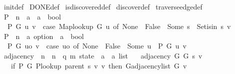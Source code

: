 \begin{isabellebody}
%
\isatagdocument
%
\isamarkuptrue%
%
\endisatagdocument
{\isafolddocument}%
%
\isadelimdocument
%
\endisadelimdocument
{}\isamarkupfalse%
\ init{\isacharunderscore}{\kern0pt}def\isanewline
\isanewline
{}\isamarkupfalse%
\ DONE{\isacharunderscore}{\kern0pt}def\isanewline
\isanewline
{}\isamarkupfalse%
\ is{\isacharunderscore}{\kern0pt}discovered{\isacharunderscore}{\kern0pt}def\isanewline
\isanewline
{}\isamarkupfalse%
\ discover{\isacharunderscore}{\kern0pt}def\isanewline
\isanewline
{}\isamarkupfalse%
\ traverse{\isacharunderscore}{\kern0pt}edge{\isacharunderscore}{\kern0pt}def\isanewline
\isanewline
{}\isamarkupfalse%
\ P\ {\isacharcolon}{\kern0pt}{\isacharcolon}{\kern0pt}\ {\isachardoublequoteopen}{\isacharprime}{\kern0pt}n\ {\isasymRightarrow}\ {\isacharprime}{\kern0pt}a\ {\isasymRightarrow}\ {\isacharprime}{\kern0pt}a\ {\isasymRightarrow}\ bool{\isachardoublequoteclose}\ \isanewline
\ \ {\isachardoublequoteopen}P\ G\ u\ v\ {\isasymequiv}\ case\ Map{\isacharunderscore}{\kern0pt}lookup\ G\ u\ of\ None\ {\isasymRightarrow}\ False\ {\isacharbar}{\kern0pt}\ Some\ s\ {\isasymRightarrow}\ Set{\isacharunderscore}{\kern0pt}isin\ s\ v{\isachardoublequoteclose}\isanewline
\isanewline
{}\isamarkupfalse%
\ P{\isacharprime}{\kern0pt}\ {\isacharcolon}{\kern0pt}{\isacharcolon}{\kern0pt}\ {\isachardoublequoteopen}{\isacharprime}{\kern0pt}n\ {\isasymRightarrow}\ {\isacharprime}{\kern0pt}a\ option\ {\isasymRightarrow}\ {\isacharprime}{\kern0pt}a\ {\isasymRightarrow}\ bool{\isachardoublequoteclose}\ \isanewline
\ \ {\isachardoublequoteopen}P{\isacharprime}{\kern0pt}\ G\ uo\ v\ {\isasymequiv}\ case\ uo\ of\ None\ {\isasymRightarrow}\ False\ {\isacharbar}{\kern0pt}\ Some\ u\ {\isasymRightarrow}\ P\ G\ u\ v{\isachardoublequoteclose}\isanewline
\isanewline
{}\isamarkupfalse%
\ adjacency\ {\isacharcolon}{\kern0pt}{\isacharcolon}{\kern0pt}\ {\isachardoublequoteopen}{\isacharprime}{\kern0pt}n\ {\isasymRightarrow}\ {\isacharprime}{\kern0pt}n\ {\isasymRightarrow}\ {\isacharparenleft}{\kern0pt}{\isacharprime}{\kern0pt}q{\isacharcomma}{\kern0pt}\ {\isacharprime}{\kern0pt}m{\isacharparenright}{\kern0pt}\ state\ {\isasymRightarrow}\ {\isacharprime}{\kern0pt}a\ {\isasymRightarrow}\ {\isacharprime}{\kern0pt}a\ list{\isachardoublequoteclose}\ \isanewline
\ \ {\isachardoublequoteopen}adjacency\ G{}\ G{}\ s\ v\ {\isasymequiv}\isanewline
\ \ \ if\ P{\isacharprime}{\kern0pt}\ G{}\ {\isacharparenleft}{\kern0pt}P{\isacharunderscore}{\kern0pt}lookup\ {\isacharparenleft}{\kern0pt}parent\ s{\isacharparenright}{\kern0pt}\ v{\isacharparenright}{\kern0pt}\ v\ then\ G{\isachardot}{\kern0pt}adjacency{\isacharunderscore}{\kern0pt}list\ G{}\ v\isanewline

\end{isabellebody}
